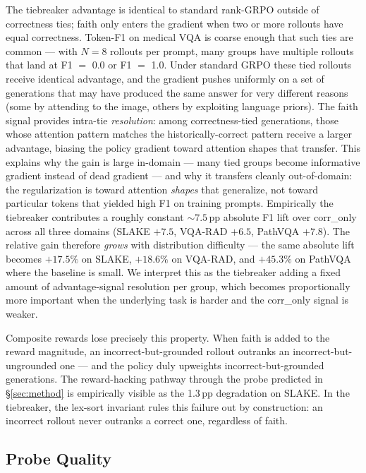 \documentclass[11pt]{article}
\begin{document}
The tiebreaker advantage is identical to standard rank-GRPO outside of
correctness ties; faith only enters the gradient when two or more
rollouts have equal correctness. Token-F1 on medical VQA is coarse
enough that such ties are common --- with $N{=}8$ rollouts per prompt,
many groups have multiple rollouts that land at F1 $=$ 0.0 or F1 $=$
1.0. Under standard GRPO these tied rollouts receive identical
advantage, and the gradient pushes uniformly on a set of generations
that may have produced the same answer for very different reasons (some
by attending to the image, others by exploiting language priors). The
faith signal provides intra-tie \emph{resolution}: among correctness-tied
generations, those whose attention pattern matches the
historically-correct pattern receive a larger advantage, biasing the
policy gradient toward attention shapes that transfer. This
explains why the gain is large in-domain --- many tied groups become
informative gradient instead of dead gradient --- and why it transfers
cleanly out-of-domain: the regularization is toward attention
\emph{shapes} that generalize, not toward particular tokens that yielded
high F1 on training prompts. Empirically the tiebreaker contributes a roughly constant $\sim$$7.5$\,pp
absolute F1 lift over corr\_only across all three domains (SLAKE
$+7.5$, VQA-RAD $+6.5$, PathVQA $+7.8$). The relative gain therefore
\emph{grows} with distribution difficulty --- the same absolute lift
becomes $+17.5\%$ on SLAKE, $+18.6\%$ on VQA-RAD, and $+45.3\%$ on
PathVQA where the baseline is small. We interpret this as the tiebreaker
adding a fixed amount of advantage-signal resolution per group, which
becomes proportionally more important when the underlying task is
harder and the corr\_only signal is weaker.

Composite rewards lose precisely this property. When faith is added to
the reward magnitude, an incorrect-but-grounded rollout outranks an
incorrect-but-ungrounded one --- and the policy duly upweights
incorrect-but-grounded generations. The reward-hacking pathway through
the probe predicted in \S\ref{sec:method} is empirically visible as the
1.3\,pp degradation on SLAKE.  In the tiebreaker, the lex-sort
invariant rules this failure out by construction: an incorrect rollout
never outranks a correct one, regardless of faith.

\subsection{Probe Quality}
\end{document}
